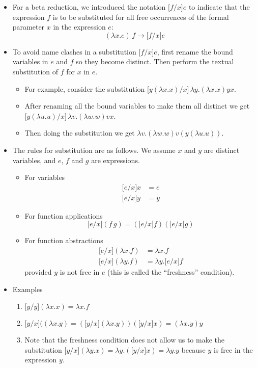 \documentclass[]{article}
\begin{document}
\begin{itemize}
\item For a beta reduction, we introduced the notation $\lbrack f/x \rbrack e$
to indicate that the expression $f$ is to be substituted for all free
occurrences of the formal parameter $x$ in the expression $e$:
\[ (\lambda x.e)\,f\rightarrow\lbrack f/x \rbrack e \]
\item To avoid name clashes in a substitution $\lbrack f/x \rbrack e$, first
rename the bound variables in $e$ and $f$ so they become distinct. Then perform
the textual substitution of $f$ for $x$ in $e$.
\begin{itemize}
\item For example, consider the substitution $\lbrack y(\lambda x.x)/x
\rbrack\,\lambda y.(\lambda x.x)yx$.
\item After renaming all the bound variables to make them all distinct we get
$\lbrack y(\lambda u.u)/x\rbrack\,\lambda v.(\lambda w.w)vx$.
\item Then doing the substitution we get $\lambda v.(\lambda w.w)v(y(\lambda
u.u))$.
\end{itemize}
\item The rules for substitution are as follows. We assume $x$ and $y$ are
distinct variables, and $e$, $f$ and $g$ are expressions.
\begin{itemize}
\item For variables
\begin{align*}
\lbrack e/x \rbrack x &= e \\
\lbrack e/x \rbrack y &= y
\end{align*}
\item For function applications
\[ \lbrack e/x \rbrack(f\,g) = (\lbrack e/x \rbrack f)(\lbrack e/x \rbrack g) \]
\item For function abstractions
\begin{align*}
\lbrack e/x \rbrack(\lambda x.f) &= \lambda x.f \\
\lbrack e/x \rbrack(\lambda y.f) &= \lambda y.\lbrack e/x \rbrack f
\end{align*}
provided $y$ is not free in $e$ (this is called the ``freshness'' condition).
\end{itemize}
\item Examples
\begin{enumerate}
\item $\lbrack y/y \rbrack (\lambda x.x) = \lambda x.f$
\item $\lbrack y/x \rbrack ((\lambda x.y) = (\lbrack y/x \rbrack(\lambda
x.y))(\lbrack y/x \rbrack x) = (\lambda x.y)y$
\item Note that the freshness condition does not allow us to make the
substitution $\lbrack y/x \rbrack(\lambda y.x) = \lambda y.(\lbrack y/x \rbrack
x) = \lambda y.y$ because $y$ is free in the expression $y$.
\end{enumerate}
\end{itemize}
\end{document}
